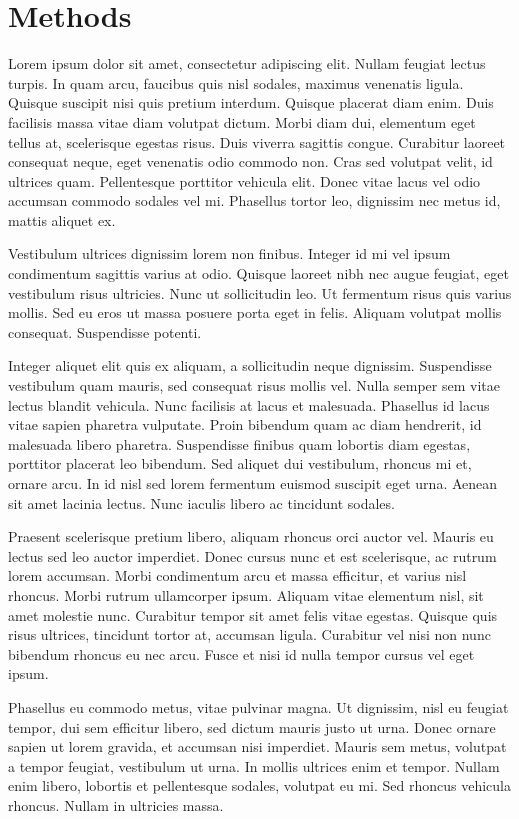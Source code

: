 \chapter{Methods}
\label{chap:methods}

Lorem ipsum dolor sit amet, consectetur adipiscing elit. Nullam feugiat lectus turpis. In quam arcu, faucibus quis nisl sodales, maximus venenatis ligula. Quisque suscipit nisi quis pretium interdum. Quisque placerat diam enim. Duis facilisis massa vitae diam volutpat dictum. Morbi diam dui, elementum eget tellus at, scelerisque egestas risus. Duis viverra sagittis congue. Curabitur laoreet consequat neque, eget venenatis odio commodo non. Cras sed volutpat velit, id ultrices quam. Pellentesque porttitor vehicula elit. Donec vitae lacus vel odio accumsan commodo sodales vel mi. Phasellus tortor leo, dignissim nec metus id, mattis aliquet ex.

Vestibulum ultrices dignissim lorem non finibus. Integer id mi vel ipsum condimentum sagittis varius at odio. Quisque laoreet nibh nec augue feugiat, eget vestibulum risus ultricies. Nunc ut sollicitudin leo. Ut fermentum risus quis varius mollis. Sed eu eros ut massa posuere porta eget in felis. Aliquam volutpat mollis consequat. Suspendisse potenti.

Integer aliquet elit quis ex aliquam, a sollicitudin neque dignissim. Suspendisse vestibulum quam mauris, sed consequat risus mollis vel. Nulla semper sem vitae lectus blandit vehicula. Nunc facilisis at lacus et malesuada. Phasellus id lacus vitae sapien pharetra vulputate. Proin bibendum quam ac diam hendrerit, id malesuada libero pharetra. Suspendisse finibus quam lobortis diam egestas, porttitor placerat leo bibendum. Sed aliquet dui vestibulum, rhoncus mi et, ornare arcu. In id nisl sed lorem fermentum euismod suscipit eget urna. Aenean sit amet lacinia lectus. Nunc iaculis libero ac tincidunt sodales.

Praesent scelerisque pretium libero, aliquam rhoncus orci auctor vel. Mauris eu lectus sed leo auctor imperdiet. Donec cursus nunc et est scelerisque, ac rutrum lorem accumsan. Morbi condimentum arcu et massa efficitur, et varius nisl rhoncus. Morbi rutrum ullamcorper ipsum. Aliquam vitae elementum nisl, sit amet molestie nunc. Curabitur tempor sit amet felis vitae egestas. Quisque quis risus ultrices, tincidunt tortor at, accumsan ligula. Curabitur vel nisi non nunc bibendum rhoncus eu nec arcu. Fusce et nisi id nulla tempor cursus vel eget ipsum.

Phasellus eu commodo metus, vitae pulvinar magna. Ut dignissim, nisl eu feugiat tempor, dui sem efficitur libero, sed dictum mauris justo ut urna. Donec ornare sapien ut lorem gravida, et accumsan nisi imperdiet. Mauris sem metus, volutpat a tempor feugiat, vestibulum ut urna. In mollis ultrices enim et tempor. Nullam enim libero, lobortis et pellentesque sodales, volutpat eu mi. Sed rhoncus vehicula rhoncus. Nullam in ultricies massa.

